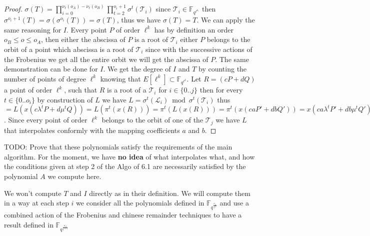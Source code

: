 \documentclass{lms}
\newcommand{\todo}[1]{{\color{red}TODO: #1}}
\begin{document}
\begin{proof}
$\sigma(T)=\prod_{i=0}^{\nu_{\ell}(o_A)-\nu_{\ell}(o_B)}\prod_{t=2}^{o_i+1}\sigma^{t}(\mathcal{T}_i)$
since $\mathcal{T}_i \in \mathbb{F}_{q^{\ell^{o_i}}}$ then $\sigma^{o_i+1}(T)=\sigma(\sigma^{o_i}(T))=\sigma(T)$, thus we have $\sigma(T)=T$. We can apply the same reasoning for $I$.
\newline
Every point $P$ of order $\ell^k$ has by definition an order $o_B \leqslant o \leqslant o_A$, then either the abscissa of $P$ is a root of $\mathcal{T}_i$ either $P$ belongs to the orbit of a point which abscissa is a root of $\mathcal{T}_i$ since with the successive actions of the Frobenius we get all the entire orbit we will get the abscissa of $P$. The same demonstration can be done for $I$. We get the degree of $I$ and $T$ by counting the number of points of degree $\ell^k$ knowing that $E[\ell^{k}] \subset \mathbb{F}_{q^{\ell^k}}$.
\newline 
Let $R=(cP+dQ)$ a point of order $\ell^k$, such that $R$ is a root of a $\mathcal{T}_i$ for $i \in \{ 0 ..j \} $ then  for every $t \in \{0..o_i \}$ by construction of $L$ we have  $L = \sigma^{t}(\mathcal{L}_i)  \bmod  \sigma^{t}(\mathcal{T}_i)$ thus  $=L(x(c\lambda^tP+d\mu^tQ))=L(\pi^t(x(R)))=\pi^t(L(x(R)))=\pi^t(x(caP'+dbQ'))=x(ca\lambda^tP'+db\mu^tQ')$. Since every point of order $\ell^k$ belongs to the orbit of one of the $\mathcal{T}_j$ we have $L$ that interpolates conformly with the mapping coefficients $a$ and $b$.
\end{proof}

\todo{Prove that these polynomials satisfy the requirements of the 
main algorithm. For the moment, we have {\bf no idea} of what interpolates
what, and how the conditions given at step 2 of the Algo of 6.1 
are necessarily satisfied by the polynomial $A$ we compute here.}




We won't compute $T$ and $I$ directly as in their definition. We will compute them in a way at each step $i$ we consider all the polynomials defined in $\mathbb{F}_{q^{\frac{o_A}{\ell^i}}}$ and use a combined action of the Frobenius and chinese remainder techniques to have a result defined in $\mathbb{F}_{q^{\frac{o_A}{\ell^{i+1}}}}$
  
\end{document}
